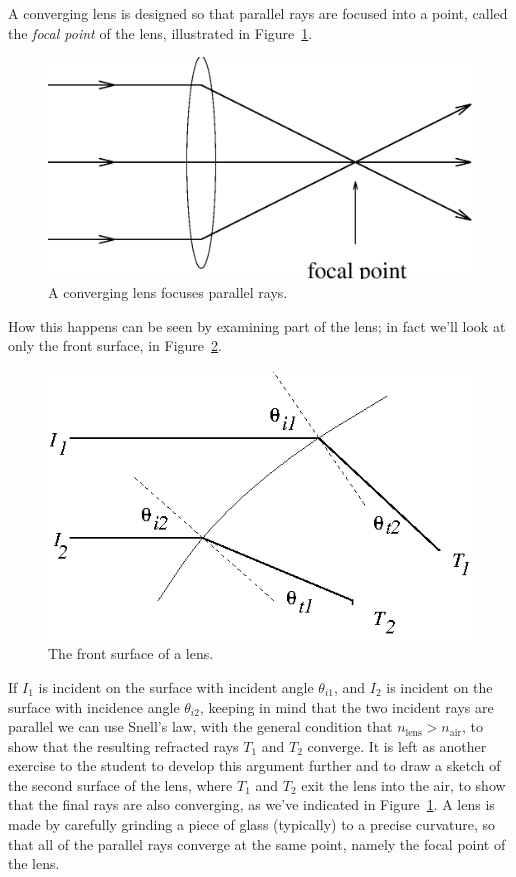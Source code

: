 A converging lens is designed so that parallel rays are focused into a point, 
called the {\it focal point} of the lens, illustrated in 
Figure~\ref{fig:opt:focalpt}.
\begin{figure}[htb]
\centering 
\epsfxsize=8cm \includegraphics[scale=0.6]{9_imaging/focalpt.eps}
\caption{A converging lens focuses parallel rays.}
\label{fig:opt:focalpt}
\end{figure}
How this happens can be seen by examining part of the lens; in fact we'll look
at only the front surface, in Figure~\ref{fig:opt:frontsurf}.
\begin{figure}[htb]
\centering 
\epsfxsize=8cm \includegraphics[scale=0.6]{9_imaging/frontsurf.eps}
\caption{The front surface of a lens.}
\label{fig:opt:frontsurf}
\end{figure}
If $I_1$ is incident on the surface with incident angle $\theta_{i1}$, and  $I_2$ is incident on the surface with incidence angle $\theta_{i2}$, keeping in mind that the two incident rays are parallel we can use Snell's law, with the general condition that $n_{\mbox{lens}}>n_{\mbox{air}}$, to show that
the resulting refracted rays $T_1$ and $T_2$ converge.  It is left as another exercise to the 
student to develop this argument further and to draw a sketch of the second
surface of the lens, where $T_1$ and $T_2$ exit the lens into the air, to 
show that the final rays are also converging, as we've indicated in 
Figure~\ref{fig:opt:focalpt}. A lens is made by carefully grinding a piece of
glass (typically) to a precise curvature, so that all of the parallel rays
converge at the same point, namely the focal point of the lens.


